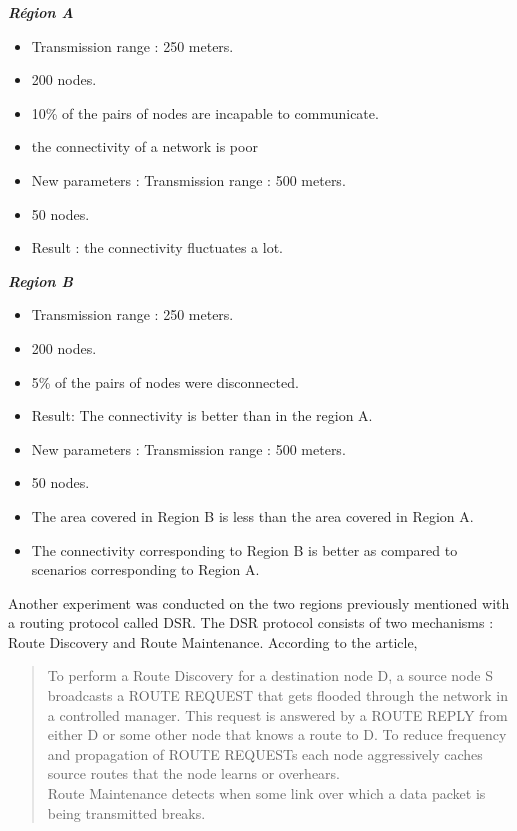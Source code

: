 \begin{multicols}{2}
\textit{\textbf{Région A}}
\begin{itemize}
\item Transmission range : 250 meters.
\item 200 nodes.
\item 10\% of the pairs of nodes are incapable to communicate.
\item the connectivity of a network is poor
\item New parameters : Transmission range : 500 meters.
\item 50 nodes.
\item Result : the connectivity fluctuates a lot.
\end{itemize}
\columnbreak
\textit{\textbf{Region B}}
\begin{itemize}
\item Transmission range : 250 meters.
\item 200 nodes.
\item 5\% of the pairs of nodes were disconnected.
\item Result: The connectivity is better than in the region A.
\item New parameters : Transmission range : 500 meters.
\item 50 nodes.
\item The area covered in Region B is less than the area covered in Region A.
\item The connectivity corresponding to Region B is better as compared to scenarios corresponding to Region A.
\end{itemize}
\end{multicols}


Another experiment was conducted on the two regions previously mentioned with a routing protocol called DSR. The DSR protocol consists of two mechanisms : Route Discovery and Route Maintenance. According to the article, 
\begin{quotation}
To perform a Route Discovery for a destination node D, a source node S broadcasts a ROUTE REQUEST that gets flooded through the network in a controlled manager. This request is answered by a ROUTE REPLY from either D or some other node that knows a route to D. To reduce frequency and propagation of ROUTE REQUESTs each node aggressively caches source routes that the node learns or overhears.\\
Route Maintenance detects when some link over which a data packet is being transmitted breaks\cite{VehicularAdHocNetworks9}.
\end{quotation}


